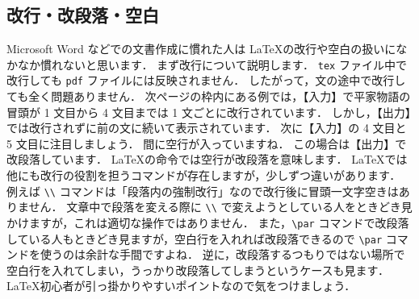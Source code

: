 \subsection{改行・改段落・空白}
\label{ssec:space}

Microsoft Word などでの文書作成に慣れた人は \LaTeX の改行や空白の扱いになかなか慣れないと思います．
まず改行について説明します．
\verb|tex| ファイル中で改行しても \verb|pdf| ファイルには反映されません．
したがって，文の途中で改行しても全く問題ありません．
次ページの枠内にある例では，【入力】で平家物語の冒頭が 1 文目から 4 文目までは 1 文ごとに改行されています．
しかし，【出力】では改行されずに前の文に続いて表示されています．
次に【入力】の 4 文目と 5 文目に注目しましょう．
間に空行が入っていますね．
この場合は【出力】で改段落しています．
\LaTeX の命令では空行が改段落を意味します．
\LaTeX では他にも改行の役割を担うコマンドが存在しますが，少しずつ違いがあります．
例えば \verb|\\| コマンドは「段落内の強制改行」なので改行後に冒頭一文字空きはありません．
文章中で段落を変える際に \verb|\\| で変えようとしている人をときどき見かけますが，これは適切な操作ではありません．
また，\verb|\par| コマンドで改段落している人もときどき見ますが，空白行を入れれば改段落できるので \verb|\par| コマンドを使うのは余計な手間ですよね．
逆に，改段落するつもりではない場所で空白行を入れてしまい，うっかり改段落してしまうというケースも見ます．
\LaTeX 初心者が引っ掛かりやすいポイントなので気をつけましょう．

